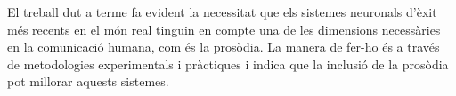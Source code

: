 El treball dut a terme fa evident la necessitat que els sistemes neuronals d’èxit més recents en el món real tinguin en compte una de les dimensions necessàries en la comunicació humana, com és la prosòdia. La manera de fer-ho és a través de metodologies experimentals i pràctiques i indica que la inclusió de la prosòdia pot millorar aquests sistemes.


\vspace*{\fill}








